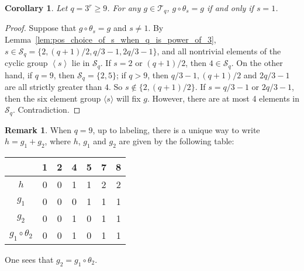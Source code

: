 \documentclass{amsart}[11pt]
\newtheorem{cor}[thm]{Corollary}
\theoremstyle{definition}
\newtheorem{rem}[thm]{Remark}
\numberwithin{equation}{section}
\theoremstyle{notitle}
\begin{document}
\begin{cor}\label{cor:primitive-cm-type-p-is-3}
  Let $q = 3^r\geq 9$. For any $g\in {\mathscr{T}}_q$, $g\circ \theta_s=g$ if
  and only if $s=1$. 
\end{cor}
\begin{proof}
  Suppose that $g\circ \theta_s=g$ and $s\neq 1$.  By
  Lemma~\ref{lem:pos_choice_of_s_when_q_is_power_of_3}, $s\in
  {\mathscr{S}}_q=\{2, (q+1)/2, q/3-1, 2q/3-1\}$, and all nontrivial elements of
  the cyclic group ${\left\langle {s} \right\rangle}$ lie in ${\mathscr{S}}_q$.  If $s=2$ or
  $(q+1)/2$, then $4\in {\mathscr{S}}_q$. On the other hand, if $q=9$, then
  ${\mathscr{S}}_q=\{2, 5\}$; if $q>9$, then $q/3-1, (q+1)/2$ and $2q/3-1$ are
  all strictly greater than $4$. So $s\not \in \{2, (q+1)/2\}$. If
  $s=q/3-1$ or $2q/3-1$, then the six element group $\langle s\rangle$
  will fix $g$. However, there are at most 4 elements in
  ${\mathscr{S}}_q$. Contradiction.
\end{proof}

\begin{rem}\label{rem:isogeny-q-is-9}
  When $q=9$, up to labeling, there is a unique way to write
  $h=g_1+g_2$, where $h$, $g_1$ and $g_2$ are given by the following
  table:
  \begin{center}
  \begin{tabular}{|c||c|c|c|c|c|c|}
\hline
    & 1 & 2 & 4 & 5 & 7 & 8 \\
\hline
  $h$ & 0 & 0 & 1 & 1 & 2 & 2 \\
  $g_1$& 0 & 0 & 0 & 1 & 1 & 1 \\
  $g_2$& 0 & 0 & 1 & 0 & 1 & 1\\
  $g_1\circ \theta_2$& 0 & 0 & 1 & 0 & 1 & 1\\
\hline
  \end{tabular}
  \end{center}
  One sees that $g_2=g_1\circ \theta_2$.
\end{rem}

  
  
  
  
  
\end{document}
